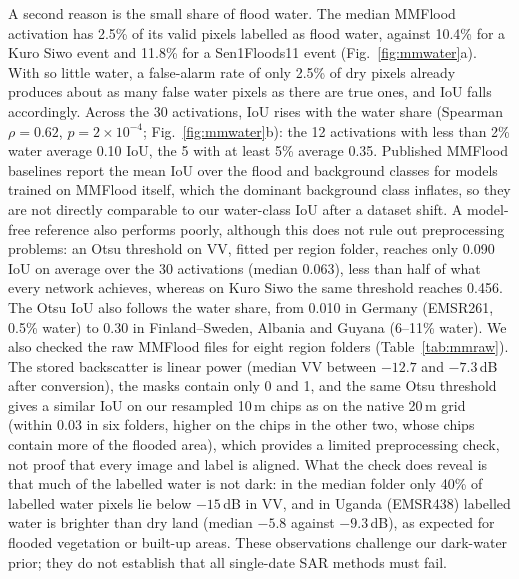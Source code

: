 \documentclass[a4paper,fleqn]{cas-sc}
\begin{document}
A second reason is the small share of flood water. The median MMFlood activation has 2.5\% of its valid pixels labelled as flood water, against 10.4\% for a Kuro Siwo event and 11.8\% for a Sen1Floods11 event (Fig.~\ref{fig:mmwater}a). With so little water, a false-alarm rate of only 2.5\% of dry pixels already produces about as many false water pixels as there are true ones, and IoU falls accordingly. Across the 30 activations, IoU rises with the water share (Spearman $\rho=0.62$, $p=2\times10^{-4}$; Fig.~\ref{fig:mmwater}b): the 12 activations with less than 2\% water average 0.10 IoU, the 5 with at least 5\% average 0.35. Published MMFlood baselines \citep{montello2022mmflood} report the mean IoU over the flood and background classes for models trained on MMFlood itself, which the dominant background class inflates, so they are not directly comparable to our water-class IoU after a dataset shift. A model-free reference also performs poorly, although this does not rule out preprocessing problems: an Otsu threshold on VV, fitted per region folder, reaches only 0.090 IoU on average over the 30 activations (median 0.063), less than half of what every network achieves, whereas on Kuro Siwo the same threshold reaches 0.456. The Otsu IoU also follows the water share, from 0.010 in Germany (EMSR261, 0.5\% water) to 0.30 in Finland--Sweden, Albania and Guyana (6--11\% water). We also checked the raw MMFlood files for eight region folders (Table~\ref{tab:mmraw}). The stored backscatter is linear power (median VV between $-12.7$ and $-7.3$\,dB after conversion), the masks contain only 0 and 1, and the same Otsu threshold gives a similar IoU on our resampled 10\,m chips as on the native 20\,m grid (within 0.03 in six folders, higher on the chips in the other two, whose chips contain more of the flooded area), which provides a limited preprocessing check, not proof that every image and label is aligned. What the check does reveal is that much of the labelled water is not dark: in the median folder only 40\% of labelled water pixels lie below $-15$\,dB in VV, and in Uganda (EMSR438) labelled water is brighter than dry land (median $-5.8$ against $-9.3$\,dB), as expected for flooded vegetation or built-up areas. These observations challenge our dark-water prior; they do not establish that all single-date SAR methods must fail.
\end{document}
